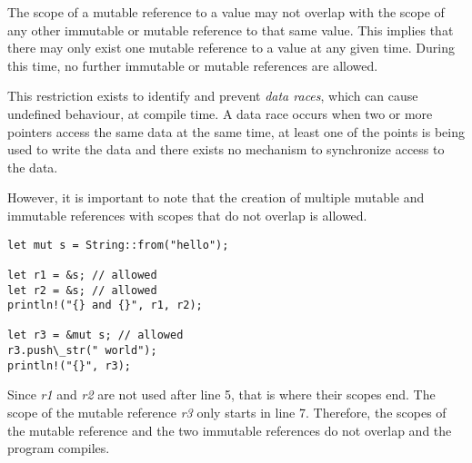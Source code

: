 \documentclass[sigplan,11pt,nonacm]{acmart}
\begin{document}
The scope of a mutable reference to a value may not overlap with the scope of any other immutable or mutable reference to that same value.
This implies that there may only exist one mutable reference to a value at any given time.
During this time, no further immutable or mutable references are allowed.

This restriction exists to identify and prevent \emph{data races}, which can cause undefined behaviour, at compile time.
A data race occurs when two or more pointers access the same data at the same time, at least one of the points is being used to write the data and there exists no mechanism to synchronize access to the data. \cite{rust-book}

However, it is important to note that the creation of multiple mutable and immutable references with scopes that do not overlap is allowed.

\begin{lstlisting}
let mut s = String::from("hello");

let r1 = &s; // allowed
let r2 = &s; // allowed
println!("{} and {}", r1, r2);

let r3 = &mut s; // allowed
r3.push\_str(" world");
println!("{}", r3);
\end{lstlisting}
\cite{rust-book}

Since \emph{r1} and \emph{r2} are not used after line 5, that is where their scopes end.
The scope of the mutable reference \emph{r3} only starts in line 7.
Therefore, the scopes of the mutable reference and the two immutable references do not overlap and the program compiles.








\end{document}
